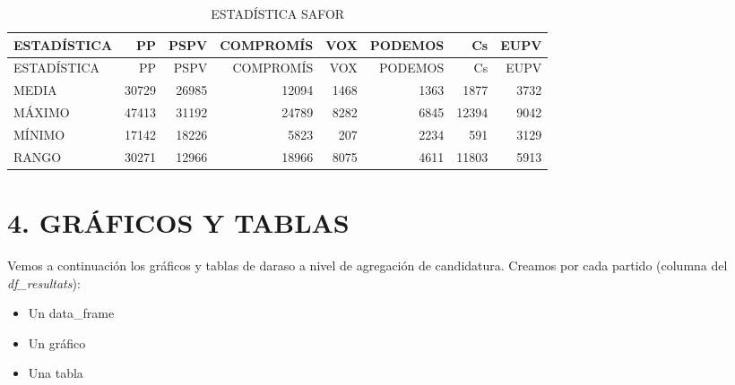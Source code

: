 \documentclass[
]{article}
\providecommand{\tightlist}{%
  \setlength{\itemsep}{0pt}\setlength{\parskip}{0pt}}
\begin{document}
\begin{longtable}[]{@{}lrrrrrrr@{}}
\caption{ESTADÍSTICA SAFOR}\tabularnewline
\toprule\noalign{}
ESTADÍSTICA & PP & PSPV & COMPROMÍS & VOX & PODEMOS & Cs & EUPV \\
\midrule\noalign{}
\endfirsthead
\toprule\noalign{}
ESTADÍSTICA & PP & PSPV & COMPROMÍS & VOX & PODEMOS & Cs & EUPV \\
\midrule\noalign{}
\endhead
\bottomrule\noalign{}
\endlastfoot
MEDIA & 30729 & 26985 & 12094 & 1468 & 1363 & 1877 & 3732 \\
MÁXIMO & 47413 & 31192 & 24789 & 8282 & 6845 & 12394 & 9042 \\
MÍNIMO & 17142 & 18226 & 5823 & 207 & 2234 & 591 & 3129 \\
RANGO & 30271 & 12966 & 18966 & 8075 & 4611 & 11803 & 5913 \\
\end{longtable}

\hypertarget{gruxe1ficos-y-tablas}{%
\section{4. GRÁFICOS Y TABLAS}\label{gruxe1ficos-y-tablas}}

Vemos a continuación los gráficos y tablas de daraso a nivel de
agregación de candidatura. Creamos por cada partido (columna del
\emph{df\_resultats}):

\begin{itemize}
\tightlist
\item
  Un data\_frame
\item
  Un gráfico
\item
  Una tabla
\end{itemize}
\end{document}
